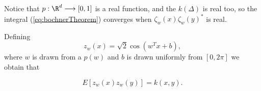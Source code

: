 Notice that $p: \R^d \longrightarrow [0,1]$ is a real function, 
and the $k(\Delta)$ is real too, so the integral (\ref{eq:bochnerTheorem})
converges when $\zeta_w(x)
\zeta_w(y)^*$ is real.

Defining 
\begin{equation}
    z_w(x) = \sqrt{2} \cos\left(w^T x + b\right), 
\end{equation}
where $w$ is drawn from a $p(w)$ and $b$ is drawn 
uniformly from $[0,2\pi]$ we obtain that 

\begin{equation} \label{unbiases_stimator}
    E \left[z_w(x) z_w(y) \right] = k(x,y). 
\end{equation}

